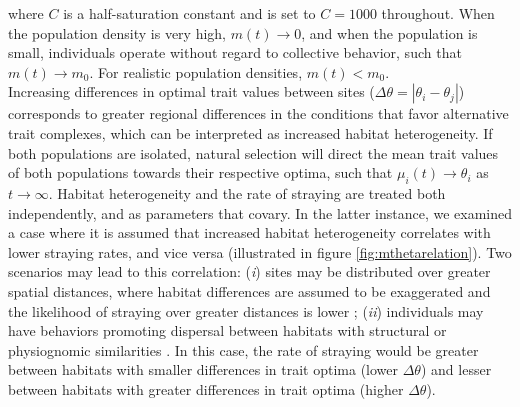 \documentclass{revtex4}
\begin{document}
\noindent where $C$ is a half-saturation constant and is set to $C=1000$ throughout.
When the population density is very high, $m(t) \rightarrow 0$, and when the population is small, individuals operate without regard to collective behavior, such that $m(t) \rightarrow m_0$.
For realistic population densities, $m(t) < m_0$.\\


\noindent Increasing differences in optimal trait values between sites ($\Delta\theta = \left|\theta_i - \theta_j\right|$) corresponds to greater regional differences in the conditions that favor alternative trait complexes, which can be interpreted as increased habitat heterogeneity.
If both populations are isolated, natural selection will direct the mean trait values of both populations towards their respective optima, such that $\mu_i(t) \rightarrow \theta_i$ as $t\rightarrow\infty$.
Habitat heterogeneity and the rate of straying are treated both independently, and as parameters that covary.
In the latter instance, we examined a case where it is assumed that increased habitat heterogeneity correlates with lower straying rates, and vice versa (illustrated in figure \ref{fig:mthetarelation}).
Two scenarios may lead to this correlation: 
(\emph{i}) sites may be distributed over greater spatial distances, where habitat differences are assumed to be exaggerated and the likelihood of straying over greater distances is lower \citep{Candy:2000hu,JPE:JPE1383};
(\emph{ii}) individuals may have behaviors promoting dispersal between habitats with structural or physiognomic similarities \citep{Peterson:2014gy}.
In this case, the rate of straying would be greater between habitats with smaller differences in trait optima (lower $\Delta\theta$) and lesser between habitats with greater differences in trait optima (higher $\Delta\theta$).
\\
\end{document}
